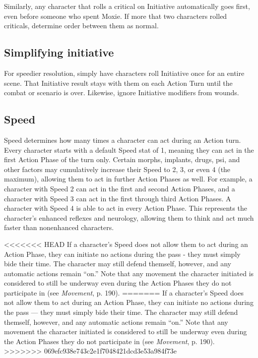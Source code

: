 Similarly, any character that rolls a critical on Initiative automatically goes first, even before someone who spent Moxie. If more that two characters rolled criticals, determine order between them as normal.

\subsection{Simplifying initiative}
\label{sec:simplifying-init}

For speedier resolution, simply have characters roll Initiative once for an entire scene. That Initiative result stays with them on each Action Turn until the combat or scenario is over. Likewise, ignore Initiative modifiers from wounds.

\subsection{Speed}
\label{sec:speed}

Speed determines how many times a character can act during an Action turn. Every character starts with a default Speed stat of 1, meaning they can act in the first Action Phase of the turn only. Certain morphs, implants, drugs, psi, and other factors may cumulatively increase their Speed to 2, 3, or even 4 (the maximum), allowing them to act in further Action Phases as well. For example, a character with Speed 2 can act in the first and second Action Phases, and a character with Speed 3 can act in the first through third Action Phases. A character with Speed 4 is able to act in every Action Phase. This represents the character’s enhanced reflexes and neurology, allowing them to think and act much faster than nonenhanced characters.

<<<<<<< HEAD
If a character’s Speed does not allow them to act during an Action Phase, they can initiate no actions during the pass - they must simply bide their time. The character may still defend themself, however, and any automatic actions remain ``on.'' Note that any movement the character initiated is considered to still be underway even during the Action Phases they do not participate in (see \emph{Movement}, p. 190).
=======
If a character’s Speed does not allow them to act during an Action Phase, they can initiate no actions during the pass --- they must simply bide their time. The character may still defend themself, however, and any automatic actions remain ``on.'' Note that any movement the character initiated is considered to still be underway even during the Action Phases they do not participate in (see \emph{Movement}, p. 190).
>>>>>>> 069efc938e743c2e1f7048421dcd3e53a984f73e


